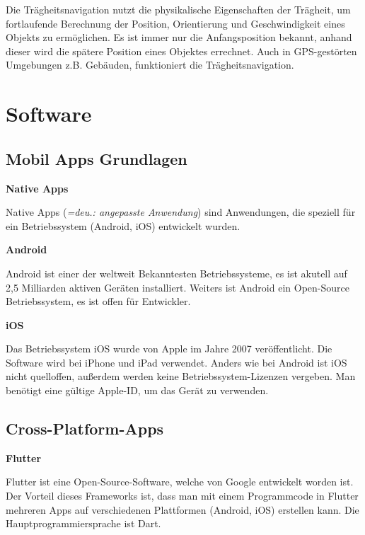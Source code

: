 Die Trägheitsnavigation nutzt die physikalische Eigenschaften der Trägheit, um fortlaufende Berechnung der Position, Orientierung und Geschwindigkeit eines Objekts zu ermöglichen. Es ist immer nur die Anfangsposition bekannt, anhand dieser wird die spätere Position eines Objektes errechnet. Auch in GPS-gestörten Umgebungen z.B. Gebäuden, funktioniert die Trägheitsnavigation. 

\cite{Traegheitsnavigation}



\section{Software}


\subsection{Mobil Apps Grundlagen}

\textbf{Native Apps}

Native Apps (\emph{=deu.: angepasste Anwendung}) sind Anwendungen, die speziell für ein Betriebssystem (Android, iOS) entwickelt wurden. 
\cite{NativeApps}

\textbf{Android}

Android ist einer der weltweit Bekanntesten Betriebssysteme, es ist akutell auf 2,5 Milliarden aktiven Geräten installiert. Weiters ist Android ein Open-Source Betriebssystem, es ist offen für Entwickler.  
\cite{Android}

\textbf{iOS}

Das Betriebssystem iOS wurde von Apple im Jahre 2007 veröffentlicht. Die Software wird bei iPhone und iPad verwendet. Anders wie bei Android ist iOS nicht quelloffen, außerdem werden keine Betriebssystem-Lizenzen vergeben. Man benötigt eine gültige Apple-ID, um das Gerät zu verwenden.
\cite{iOS}

\subsection{Cross-Platform-Apps}

\textbf{Flutter}

Flutter ist eine Open-Source-Software, welche von Google entwickelt worden ist. Der Vorteil dieses Frameworks ist, dass man mit einem Programmcode in Flutter mehreren Apps auf verschiedenen Plattformen (Android, iOS) erstellen kann. Die Hauptprogrammiersprache ist Dart.

\cite{Flutter}

